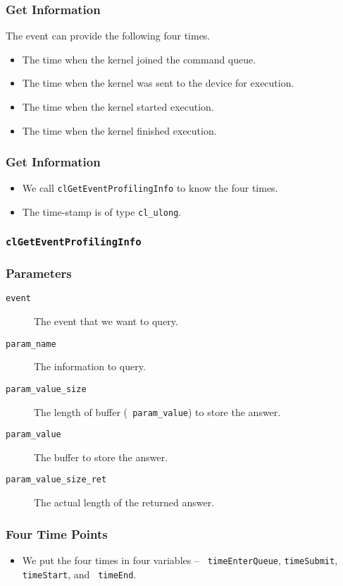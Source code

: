 \documentclass{beamer}
\begin{document}
\begin{frame}
  \frametitle{Get Information}
  The event can provide the following four times.
  \begin{itemize}
    \item The time when the kernel joined the command queue.
    \item The time when the kernel was sent to the device for execution.
    \item The time when the kernel started execution.
    \item The time when the kernel finished execution.
  \end{itemize}
\end{frame}

\begin{frame}
  \frametitle{Get Information}
  \begin{itemize}
    \item We call {\tt clGetEventProfilingInfo} to know the four
      times.
    \item The time-stamp is of type {\tt cl\_ulong}.
  \end{itemize}
\end{frame}

\begin{frame}
  \frametitle{\tt clGetEventProfilingInfo}
\end{frame}

\begin{frame}
  \frametitle{Parameters}
  \begin{description}
  \item [\tt event] The event that we want to query.
  \item [\tt param\_name] The information to query.
  \item [\tt param\_value\_size] The length of buffer ({\tt
    param\_value}) to store the answer.
  \item [\tt param\_value] The buffer to store the answer.
  \item [\tt param\_value\_size\_ret] The actual length of the
    returned answer.
  \end{description}
\end{frame}

\begin{frame}
  \frametitle{Four Time Points}
  \begin{itemize}
  \item We put the four times in four variables -- {\tt
    timeEnterQueue}, {\tt timeSubmit}, {\tt timeStart}, and {\tt
    timeEnd}.
  \end{itemize}
\end{frame}
\end{document}
